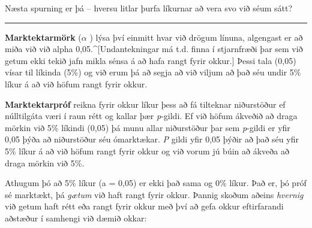 \documentclass[
]{book}
\theoremstyle{definition}
\theoremstyle{definition}
\theoremstyle{definition}
\theoremstyle{definition}
\theoremstyle{remark}
\begin{document}
Næsta spurning er þá -- hversu litlar þurfa líkurnar að vera svo við séum sátt?

\begin{center}\rule{0.5\linewidth}{0.5pt}\end{center}

\textbf{Marktektarmörk} (\(\alpha\) ) lýsa því einmitt hvar við drögum línuna, algengast er að miða við við alpha 0,05.\^{}{[}Undantekningar má t.d. finna í stjarnfræði þar sem við getum ekki tekið jafn mikla sénsa á að hafa rangt fyrir okkur.{]} Þessi tala (0,05) vísar til líkinda (5\%) og við erum þá að segja að við viljum
að það séu undir 5\% líkur á að við höfum rangt fyrir okkur.

\textbf{Marktektarpróf} reikna fyrir okkur líkur þess að fá tilteknar niðurstöður ef núlltilgáta væri í raun rétt og kallar þær \emph{p}-gildi. Ef við höfum ákveðið að draga mörkin við 5\% líkindi (0,05) þá munu allar niðurstöður þar sem \emph{p}-gildi er yfir 0,05 þýða að niðurstöður séu ómarktækar. \emph{P} gildi yfir 0,05 þýðir að það séu yfir 5\% líkur á að við höfum rangt fyrir okkur og við vorum jú búin að ákveða að draga mörkin við 5\%.

Athugum þó að 5\% líkur (a = 0,05) er ekki það sama og 0\% líkur. Það er, þó próf sé marktækt, þá \emph{gætum} við haft rangt fyrir okkur. Þannig skoðum aðeins \emph{hvernig} við getum haft rétt eða rangt fyrir okkur með því að gefa okkur eftirfarandi aðstæður í samhengi við dæmið okkar:
\end{document}

